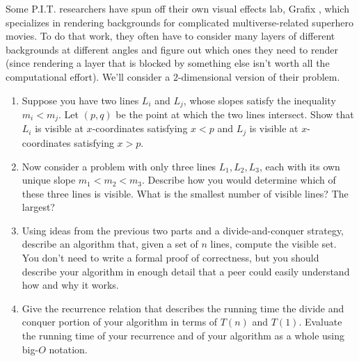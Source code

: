 \documentclass[12 pt, letterpaper]{hmcpset}
\begin{document}
\begin{problem}
	Some P.I.T. researchers have spun off their own visual effects lab, Grafix , which specializes in rendering backgrounds for complicated multiverse-related superhero movies. To do that work, they often have to consider many layers of different backgrounds at different angles and figure out which ones they need to render (since rendering a layer that is blocked by something else isn't worth all the computational effort). We'll consider a $2$-dimensional version of their problem.

	\begin{enumerate}
		\item Suppose you have two lines $L_{i}$ and $L_{j}$, whose slopes satisfy the inequality $m_{i} < m_{j}$. Let $(p, q)$ be the point at which the two lines intersect. Show that $L_{i}$ is visible at $x$-coordinates satisfying $x < p$ and $L_{j}$ is visible at $x$-coordinates satisfying $x > p$.

		\item Now consider a problem with only three lines $L_{1}, L_{2}, L_{3}$, each with its own unique slope $m_{1} < m_{2} < m_{3}$. Describe how you would determine which of these three lines is visible. What is the smallest number of visible lines? The largest?

		\item Using ideas from the previous two parts and a divide-and-conquer strategy, describe an algorithm that, given a set of $n$ lines, compute the visible set. You don't need to write a formal proof of correctness, but you should describe your algorithm in enough detail that a peer could easily understand how and why it works.

		\item Give the recurrence relation that describes the running time the divide and conquer portion of your algorithm in terms of $T(n)$ and $T(1)$. Evaluate the running time of your recurrence and of your algorithm as a whole using big-$O$ notation.
	\end{enumerate}
\end{problem}
\end{document}
